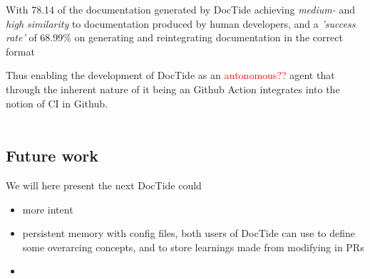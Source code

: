 With 78.14\‰ of the documentation generated by DocTide achieving \textit{medium-} and \textit{high similarity} to documentation produced by human developers, and a \textit{'success rate'} of 68.99\% on generating and reintegrating documentation in the correct format




Thus enabling the development of DocTide as an \textcolor{red}{autonomous??} agent that through the inherent nature of it being an Github Action integrates into the notion of CI in Github. 
\\\\


\subsection{Future work}
We will here present the next DocTide could 
\begin{itemize}
    \item more intent 
        \item persistent memory with config files, both users of DocTide can use to define some overarcing concepts, and to store learnings made from modifying in PRs
        \item 
\end{itemize}